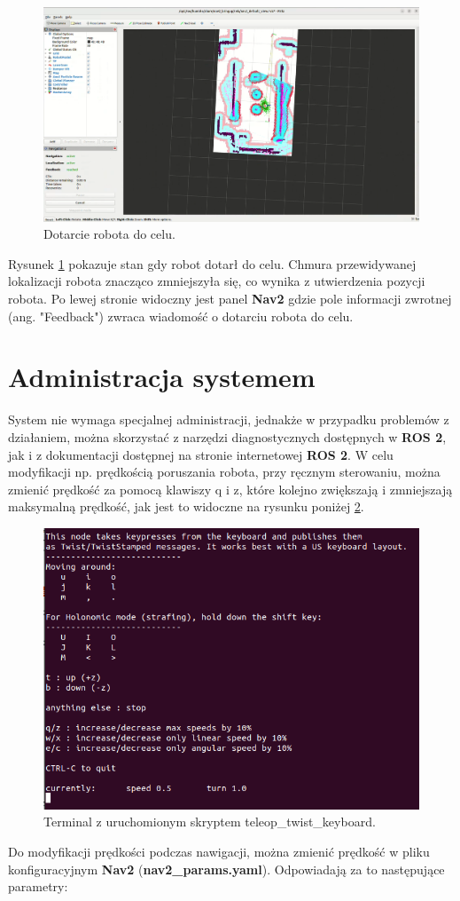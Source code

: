 \documentclass[a4paper,twoside,12pt]{book}
\begin{document}
\begin{figure}[!hb]
	\centering
	\includegraphics[width=1\textwidth]{images/launch-nav6.png}
	\caption{Dotarcie robota do celu.}
	\label{fig:nav-map6}
\end{figure}
\newpage
Rysunek \ref{fig:nav-map6} pokazuje stan gdy robot dotarł do celu. Chmura przewidywanej lokalizacji robota znacząco zmniejszyła się, co wynika z utwierdzenia pozycji robota. Po lewej stronie widoczny jest panel \textbf{Nav2} gdzie pole informacji zwrotnej (ang. "Feedback") zwraca wiadomość o dotarciu robota do celu.
\section{Administracja systemem}
System nie wymaga specjalnej administracji, jednakże w przypadku problemów z działaniem, można skorzystać z narzędzi diagnostycznych dostępnych w \textbf{ROS 2}, jak i z dokumentacji dostępnej na stronie internetowej \textbf{ROS 2}. W celu modyfikacji np. prędkością poruszania robota, przy ręcznym sterowaniu, można zmienić prędkość za pomocą klawiszy q i z, które kolejno zwiększają i zmniejszają maksymalną prędkość, jak jest to widoczne na rysunku poniżej \ref{fig:tele}. 
\begin{figure}[!hb]
	\centering
	\includegraphics[width=1\textwidth]{images/tele.png}
	\caption{Terminal z uruchomionym skryptem teleop\_twist\_keyboard.}
	\label{fig:tele}
\end{figure}
\newpage
Do modyfikacji prędkości podczas nawigacji, można zmienić prędkość w pliku konfiguracyjnym \textbf{Nav2} (\textbf{nav2\_params.yaml}).
Odpowiadają za to następujące parametry:
\end{document}
